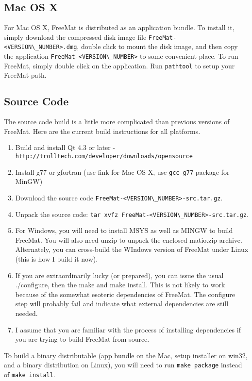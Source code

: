 \subsection{Mac OS X}

For Mac OS X, FreeMat is distributed as an application bundle.  To install it,
simply download the compressed disk image file \verb|FreeMat-<VERSION\_NUMBER>.dmg|, double
click to mount the disk image, and then copy the application \verb|FreeMat-<VERSION\_NUMBER>| to
some convenient place.  To run FreeMat, simply double click on the application.  Run
\verb|pathtool| to setup your FreeMat path.
\subsection{Source Code}

The source code build is a little more complicated than previous versions of FreeMat.  Here
are the current build instructions for all platforms.
\begin{enumerate}
\item Build and install Qt 4.3 or later - \verb|http://trolltech.com/developer/downloads/opensource|
\item Install g77 or gfortran (use fink for Mac OS X, use \verb|gcc-g77| package for MinGW)
\item Download the source code \verb|FreeMat-<VERSION\_NUMBER>-src.tar.gz|.
\item Unpack the source code: \verb|tar xvfz FreeMat-<VERSION\_NUMBER>-src.tar.gz|.
\item For Windows, you will need to install MSYS as well as MINGW to
build FreeMat.  You will also need unzip to unpack the enclosed
matio.zip archive.  Alternately, you can cross-build the WIndows version
of FreeMat under Linux (this is how I build it now).
\item If you are extraordinarily lucky (or prepared), you can issue the
usual ./configure, then the make and make install.
This is not likely to work
because of the somewhat esoteric dependencies of FreeMat.  The configure
step will probably fail and indicate what external dependencies are
still needed. 
\item I assume that you are familiar with the process of installing 
dependencies if you are trying to build FreeMat from source.
\end{enumerate}
To build a binary distributable (app bundle on the Mac, setup
installer on win32, and a binary distribution on Linux), you will
need to run \verb|make package| instead of \verb|make install|.
